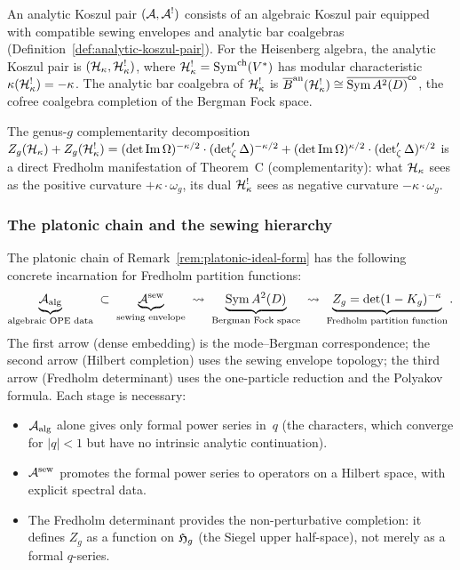 \begin{remark}%
\label{rem:thqg-X-analytic-koszul}%
%
An analytic Koszul pair $(\mathcal{A}, \mathcal{A}^!)$ consists of an
algebraic Koszul pair equipped with compatible sewing
envelopes and analytic bar coalgebras
(Definition~\ref{def:analytic-koszul-pair}). For the
Heisenberg algebra, the analytic Koszul pair is
$(\mathcal{H}_\kappa, \mathcal{H}_\kappa^!)$,
where $\mathcal{H}_\kappa^! = \operatorname{Sym}^{\mathrm{ch}}(V^*)$ has
modular characteristic $\kappa(\mathcal{H}_\kappa^!) = -\kappa$.
The analytic bar coalgebra of $\mathcal{H}_\kappa^!$
is $\overline{B}^{\mathrm{an}}(\mathcal{H}_\kappa^!) \cong
\overline{\operatorname{Sym} A^2(D)}^{\mathsf{co}}$, the
cofree coalgebra completion of the Bergman Fock space.

The genus-$g$ complementarity decomposition
$Z_g(\mathcal{H}_\kappa) + Z_g(\mathcal{H}_\kappa^!)
= (\det\operatorname{Im}\Omega)^{-\kappa/2}
\cdot (\det\nolimits'_\zeta\Delta)^{-\kappa/2}
+ (\det\operatorname{Im}\Omega)^{\kappa/2}
\cdot (\det\nolimits'_\zeta\Delta)^{\kappa/2}$
is a direct Fredholm manifestation of Theorem~C
(complementarity): what $\mathcal{H}_\kappa$ sees as the positive
curvature $+\kappa \cdot \omega_g$, its dual $\mathcal{H}_\kappa^!$
sees as negative curvature $-\kappa \cdot \omega_g$.
\end{remark}

\subsubsection{The platonic chain and the sewing hierarchy}

\begin{remark}%
\label{rem:thqg-X-platonic-chain}%
%
The platonic chain of Remark~\ref{rem:platonic-ideal-form}
has the following concrete incarnation for Fredholm partition
functions:
\[
\underbrace{\mathcal{A}_{\mathrm{alg}}}_{\text{algebraic OPE data}}
\;\subset\;
\underbrace{\mathcal{A}^{\mathrm{sew}}}_{\text{sewing envelope}}
\;\rightsquigarrow\;
\underbrace{\operatorname{Sym} A^2(D)}_{\text{Bergman Fock space}}
\;\rightsquigarrow\;
\underbrace{Z_g = \det(1 - K_g)^{-\kappa}}_{\text{Fredholm
partition function}}.
\]
The first arrow (dense embedding) is the mode--Bergman
correspondence; the second arrow (Hilbert completion) uses
the sewing envelope topology; the third arrow (Fredholm
determinant) uses the one-particle reduction and the
Polyakov formula.
Each stage is necessary:
\begin{itemize}
\item $\mathcal{A}_{\mathrm{alg}}$ alone gives only formal power series in~$q$
 (the characters, which converge for $|q| < 1$ but have no
 intrinsic analytic continuation).
\item $\mathcal{A}^{\mathrm{sew}}$ promotes the formal power series to operators
 on a Hilbert space, with explicit spectral data.
\item The Fredholm determinant provides the non-perturbative
 completion: it defines $Z_g$ as a function on $\mathfrak{H}_g$
 (the Siegel upper half-space), not merely as a formal
 $q$-series.
\end{itemize}
\end{remark}

